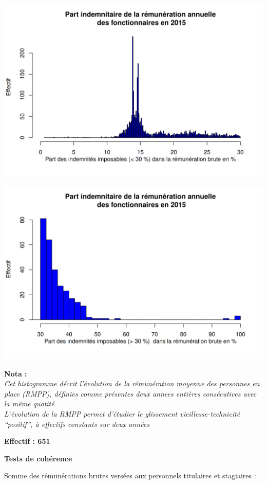 \includegraphics{altair_files/figure-latex/unnamed-chunk-43-5.png}

\includegraphics{altair_files/figure-latex/unnamed-chunk-43-6.png}

\textbf{Nota :}\\
\emph{Cet histogramme décrit l'évolution de la rémunération moyenne des
personnes en place (RMPP), définies comme présentes deux annees entières
consécutives avec la même quotité}\\
\emph{L'évolution de la RMPP permet d'étudier le glissement
vieillesse-technicité ``positif'', à effectifs constants sur deux
années}

\textbf{Effectif : 651 }

\textbf{Tests de cohérence}

Somme des rémunérations brutes versées aux personnels titulaires et
stagiaires :

